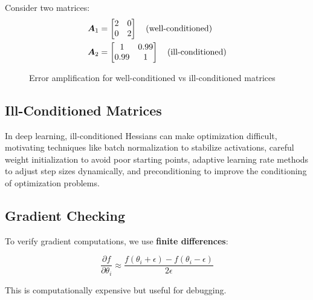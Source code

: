 Consider two matrices:
\begin{align}
\boldsymbol{A}_1 &= \begin{bmatrix} 2 & 0 \\ 0 & 2 \end{bmatrix} \quad \text{(well-conditioned)} \\
\boldsymbol{A}_2 &= \begin{bmatrix} 1 & 0.99 \\ 0.99 & 1 \end{bmatrix} \quad \text{(ill-conditioned)}
\end{align}

\begin{figure}[h]
\centering
{}
\caption{Error amplification for well-conditioned vs ill-conditioned matrices}
\label{fig:condition-number}
\end{figure}

\subsection{Ill-Conditioned Matrices}

In deep learning, ill-conditioned Hessians can make optimization difficult, motivating techniques like batch normalization to stabilize activations, careful weight initialization to avoid poor starting points, adaptive learning rate methods to adjust step sizes dynamically, and preconditioning to improve the conditioning of optimization problems.

\subsection{Gradient Checking}

To verify gradient computations, we use \textbf{finite differences}:

\begin{equation}
\frac{\partial f}{\partial \theta_i} \approx \frac{f(\theta_i + \epsilon) - f(\theta_i - \epsilon)}{2\epsilon}
\end{equation}

This is computationally expensive but useful for debugging.

